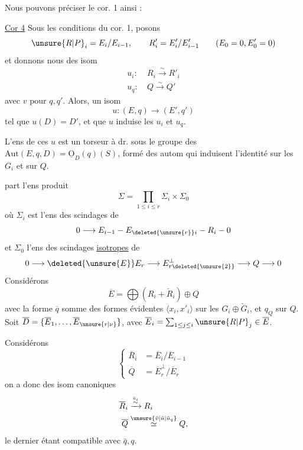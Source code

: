 Nous pouvons préciser le cor. 1 ainsi :

\uline{Cor 4} Sous les conditions du cor. 1, posons  
\[
\unsure{R|P}_i=E_i/E_{i-1},\qquad R'_i=E'_i/E'_{i-1}\qquad(E_0=0,E'_0=0)
\]
et donnons nous des isom
\[
\begin{aligned}
u_i:\ &R_i\xrightarrow{\sim}R'_i\\
u_q:\ &Q\xrightarrow{\sim}Q'
\end{aligned}
\]
avec $v$  pour $q,q'$. Alors,    un isom
\[
u:(E,q)\longrightarrow(E',q')
\]
tel que $u(D)=D'$, et que $u$ induise les $u_i$ et $u_q$.

 L'ens de ces $u$ est  un torseur à dr. sous le  groupe  des  $\mathrm{Aut}(E,q,D)=\underline{\mathrm O}_D(q)(S)$, formé des autom qui induisent l'identité sur les $G_i$ et sur $Q$.

  part l'ens  produit
\[
\Sigma=\prod_{1\leq i\leq r}\Sigma_i\times\Sigma_0
\]
où $\Sigma_i$ est l'ens des scindages de
\[
0\longrightarrow E_{i-1}\mathbin{-}E_{\deleted{\unsure{r}}i}\mathbin{-}R_i\mathbin{-}0
\]
et $\Sigma_0$ l'ens des scindages \uline{isotropes} de
\[
0\longrightarrow\deleted{\unsure{E}}E_r\longrightarrow E_{r\deleted{\unsure{2}}}^{\perp}\longrightarrow Q\longrightarrow0
\]
 Considérons  
\[
\overline E=\bigoplus(R_i+\check R_i)\oplus Q
\]
avec la forme $\overline q$ somme des formes
évidentes $\langle x_i,x'_i\rangle$ sur les $G_i\oplus\check G_i$, et $q_Q$ sur $Q$.  Soit $\overline D=\{\overline E_1,\ldots,\overline E_{\unsure{r|\nu}}\}$, avec $\overline E_i=\sum_{1\leq j\leq i}\unsure{R|P}_j\in\overline E$. 

Considérons
\[
\left\{\begin{aligned}
\overline R_i&=\overline E_i/\overline E_{i-1}\\
\overline Q&=\overline E_r^\perp/\overline E_r
\end{aligned}\right.
\]
on a donc des isom canoniques
\[
\begin{aligned}
\overline R_i&\xrightarrow{\overset{\bar u_i}{\sim}}R_i\\
\overline Q&\mathrel{\overset{\unsure{\bar v|\bar u|\bar u_q}}{\simeq}}Q,
\end{aligned}
\]
le dernier étant compatible avec $\bar q,q$.

